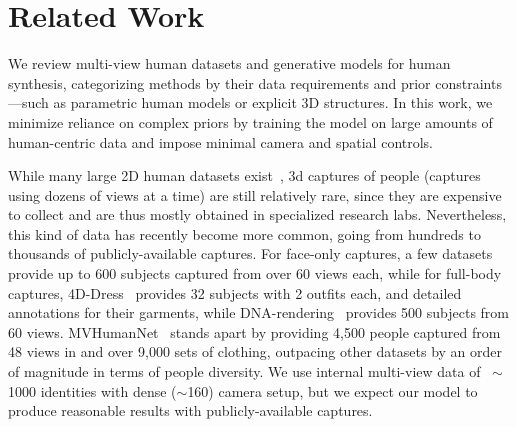 \section{Related Work}
\label{sec:related_works}


We review multi-view human datasets and generative models for human synthesis,  categorizing methods by their data requirements and prior constraints—such as parametric human models or explicit 3D structures. In this work, we minimize reliance on complex priors by training the model on large amounts of human-centric data and impose minimal camera and spatial 
controls.


\vspace{1mm}
While many large 2D human datasets exist~\cite{lin2019coco, LAION, ImageNet}, 3d captures of people (\ie captures using dozens of views at a time) are still relatively rare, since they are expensive to collect and are thus mostly obtained in specialized research labs.
Nevertheless, this kind of data has recently become more common, going from hundreds to thousands of publicly-available captures.
For face-only captures, a few datasets~\cite{Yu_2020_CVPR,yang2020facescape,yenamandra2020i3dmm,2023renderme360,martinez2024codec} provide up to 600 subjects captured from over 60 views each,
while for full-body captures, 4D-Dress~\cite{wang20244ddress} provides 32 subjects with 2 outfits each, and detailed annotations for their garments, while DNA-rendering~\cite{2023dnarendering} provides 500 subjects from 60 views.
MVHumanNet~\cite{xiong2024mvhumannet} stands apart by providing 4,500 people captured from 48 views in and over 9,000 sets of clothing, outpacing other datasets by an order of magnitude in terms of people diversity.
We use internal multi-view data of $~\sim$1000 identities with dense ($\sim$160) 
camera setup, but we expect our model to produce reasonable results
with publicly-available captures.


